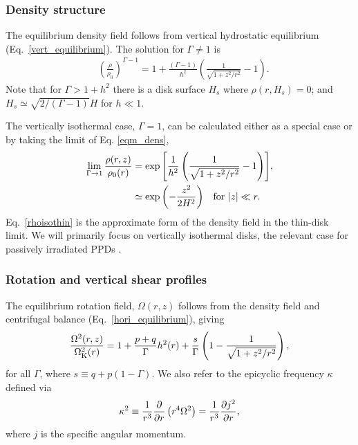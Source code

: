 \subsubsection{Density structure}
The equilibrium density field follows from vertical hydrostatic equilibrium (Eq.\ \ref{vert_equilibrium}).
The solution for $\Gamma\neq1$ is
\begin{align}\label{eqm_dens}
  &\left(\frac{\rho}{\rho_0}\right)^{\Gamma-1} = 1 +
  \frac{\left(\Gamma-1\right)}{ h^2}\left(\frac{1}{\sqrt{1+z^2/r^2}}-1\right).
\end{align}
Note that for $\Gamma > 1 +  h^2$ there is a disk surface $H_s$
where $\rho(r,H_s)=0$; and $H_s \simeq \sqrt{2/(\Gamma-1)}H$ for $h\ll 1$.

The vertically isothermal case, $\Gamma = 1$, can be calculated either 
as a special case or by taking the limit of Eq. \ref{eqm_dens},    
\begin{subequations}\begin{align}
\lim_{\Gamma\to1}  \frac{\rho(r,z)}{\rho_0(r)} &=
  \exp{\left[\frac{1}{ h^2}\left(\frac{1}{\sqrt{1+z^2/r^2}}-1\right)\right]},   \\
  & \simeq \exp {\left( - {z^2 \over 2 H^2}\right)} \quad\text{for } |z|\ll r \label{rhoisothin}. 
  \end{align}\end{subequations}
Eq.\ \ref{rhoisothin} is the approximate form of the density field in the thin-disk limit.  
We will primarily focus on 
vertically isothermal disks, the relevant case for passively irradiated
PPDs \citep{chiang97}. 

 
 \subsubsection{Rotation and vertical shear profiles}\label{vshear_def}
The equilibrium rotation field, $\Omega(r,z)$ follows from the density field and centrifugal balance (Eq.\ \ref{hori_equilibrium}),
giving 
\begin{align}\label{eqm_rot}
  \frac{\Omega^2(r,z)}{\Omega_{\rm K}^2(r)}=1 +
  \frac{p+q}{\Gamma} h^2(r) 
  +\frac{s}{\Gamma} \left(1-\frac{1}{\sqrt{1+z^2/r^2}}\right), 
\end{align}
for all $\Gamma$, where $s\equiv q+p(1-\Gamma)$.  We also refer to the
epicyclic frequency $\kappa$ defined via
\begin{align}\label{kap2_def}
\kappa^2 \equiv \frac{1}{r^3}\frac{\partial}{\partial r}\left(r^4\Omega^2\right) = \frac{1}{r^3}\frac{\partial j^2}{\partial r}, 
\end{align}
where $j$ is the specific angular momentum. 

